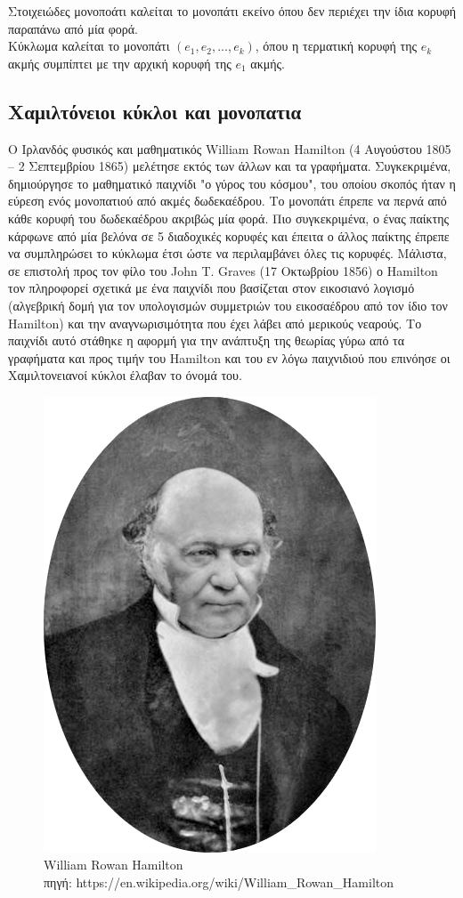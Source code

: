 \documentclass[oneside,12pt]{book}
\newenvironment{matlab}
	{\begin{figure}[hp]\centering\captionsetup{justification=centering}}
	{\end{figure}}
\theoremstyle{definition}
\begin{document}
Στοιχειώδες μονοποάτι καλείται το μονοπάτι εκείνο όπου δεν περιέχει την ίδια κορυφή παραπάνω από μία φορά. \\

Κύκλωμα καλείται το μονοπάτι \((e_1, e_2,...,e_k)\), όπου η τερματική κορυφή της \(e_k\) ακμής συμπίπτει με την αρχική κορυφή της \(e_1\) ακμής. \\

\subsection{Χαμιλτόνειοι κύκλοι και μονοπατια}

O Ιρλανδός φυσικός και μαθηματικός William Rowan Hamilton (4 Αυγούστου 1805 – 2 Σεπτεμβρίου 1865) μελέτησε εκτός των άλλων και τα γραφήματα. Συγκεκριμένα, δημιούργησε το μαθηματικό παιχνίδι "ο γύρος του κόσμου", του οποίου σκοπός ήταν η εύρεση ενός μονοπατιού από ακμές δωδεκαέδρου. Το μονοπάτι έπρεπε να περνά από κάθε κορυφή του δωδεκαέδρου ακριβώς μία φορά. Πιο συγκεκριμένα, ο ένας παίκτης κάρφωνε από μία βελόνα σε 5 διαδοχικές κορυφές και έπειτα ο άλλος παίκτης έπρεπε να συμπληρώσει το κύκλωμα έτσι ώστε να περιλαμβάνει όλες τις κορυφές. Μάλιστα, σε επιστολή προς τον φίλο του John T. Graves (17 Οκτωβρίου 1856) ο Hamilton τον πληροφορεί σχετικά με ένα παιχνίδι που βασίζεται στον εικοσιανό λογισμό (αλγεβρική δομή για τον υπολογισμών συμμετριών του εικοσαέδρου από τον ίδιο τον Hamilton) και την αναγνωρισιμότητα που έχει λάβει από μερικούς νεαρούς. Το παιχνίδι αυτό στάθηκε η αφορμή για την ανάπτυξη της θεωρίας γύρω από τα γραφήματα και προς τιμήν του Hamilton και του εν λόγω παιχνιδιού που επινόησε οι Χαμιλτονειανοί κύκλοι έλαβαν το όνομά του. \\

\begin{matlab}
	\includegraphics[scale=0.2]{images/Hamilton.png}
	\caption{William Rowan Hamilton \\ πηγή: https://en.wikipedia.org/wiki/William\_Rowan\_Hamilton}
\end{matlab}  
\end{document}
